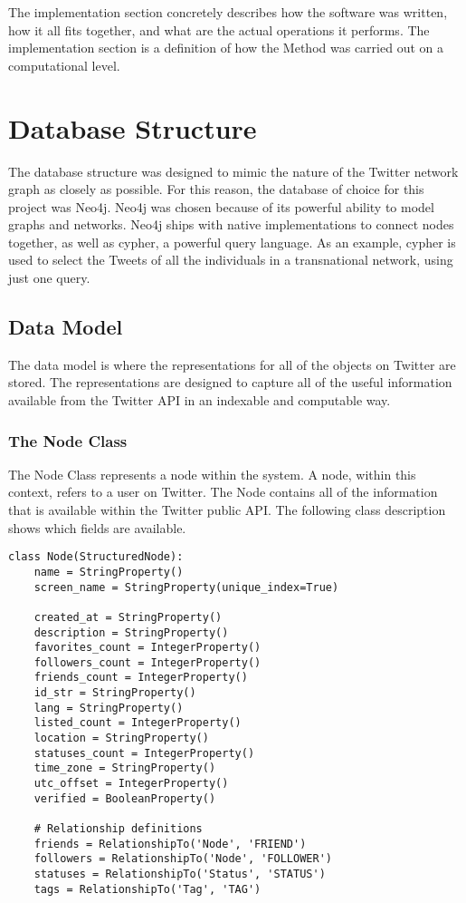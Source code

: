 The implementation section concretely describes how the software was
written, how it all fits together, and what are the actual operations
it performs. The implementation section is a definition of how the
Method was carried out on a computational level.

\section{Database Structure}
The database structure was designed to mimic the nature of the Twitter
network graph as closely as possible. For this reason, the database of
choice for this project was Neo4j. Neo4j was chosen because of its
powerful ability to model graphs and networks. Neo4j ships with native
implementations to connect nodes together, as well as cypher, a
powerful query language. As an example, cypher is used to select the
Tweets of all the individuals in a transnational network, using just
one query.

\subsection{Data Model}
The data model is where the representations for all of the objects on
Twitter are stored. The representations are designed to capture all of
the useful information available from the Twitter API in an indexable
and computable way.

\subsubsection{The Node Class}
The Node Class represents a node within the system. A node, within
this context, refers to a user on Twitter. The Node contains all of
the information that is available within the Twitter public API. The
following class description shows which fields are available.

\begin{lstlisting}
class Node(StructuredNode):
    name = StringProperty()
    screen_name = StringProperty(unique_index=True)
    
    created_at = StringProperty()
    description = StringProperty()
    favorites_count = IntegerProperty()
    followers_count = IntegerProperty()
    friends_count = IntegerProperty()
    id_str = StringProperty()
    lang = StringProperty()
    listed_count = IntegerProperty()
    location = StringProperty()
    statuses_count = IntegerProperty()
    time_zone = StringProperty()
    utc_offset = IntegerProperty()
    verified = BooleanProperty()
    
    # Relationship definitions
    friends = RelationshipTo('Node', 'FRIEND')
    followers = RelationshipTo('Node', 'FOLLOWER')
    statuses = RelationshipTo('Status', 'STATUS')
    tags = RelationshipTo('Tag', 'TAG')
\end{lstlisting}

